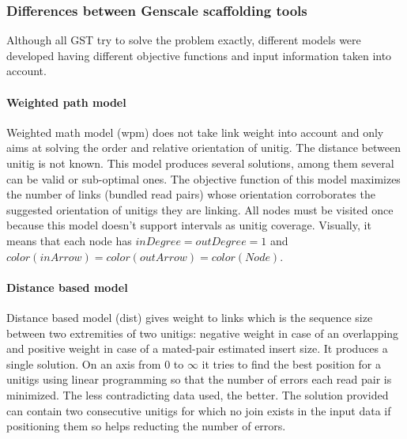 \documentclass[12pt]{article}
\begin{document}
\subsubsection{Differences between Genscale scaffolding tools}\label{sec:gstdiff}
Although all GST try to solve the problem exactly, different models were developed having different objective functions and input information taken into account.
\paragraph*{Weighted path model} Weighted math model (wpm) does not take link weight into account and only aims at solving the order and relative orientation of unitig. The distance between unitig is not known. This model produces several solutions, among them several can be valid or sub-optimal ones. The objective function of this model maximizes the number of links (bundled read pairs) whose orientation corroborates the suggested orientation of unitigs they are linking. All nodes must be visited once because this model doesn't support intervals as unitig coverage. Visually, it means that each node has $inDegree=outDegree=1$ and $color(inArrow)=color(outArrow)=color(Node)$.

\paragraph*{Distance based model} Distance based model (dist) gives weight to links which is the sequence size between two extremities of two unitigs: negative weight in case of an overlapping and positive weight in case of a mated-pair estimated insert size. It produces a single solution. On an axis from 0 to $\infty$ it tries to find the best position for a unitigs using linear programming so that the number of errors each read pair is minimized. The less contradicting data used, the better. The solution provided can contain two consecutive unitigs for which no join exists in the input data if positioning them so helps reducting the number of errors. 
\end{document}
